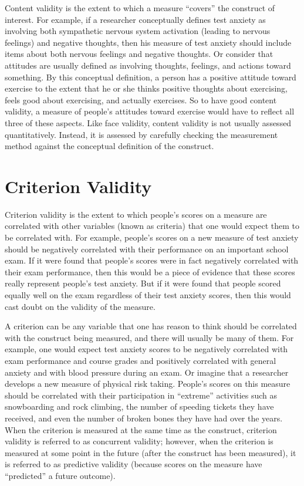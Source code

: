 \documentclass[]{book}
\theoremstyle{definition}
\theoremstyle{definition}
\theoremstyle{remark}
\begin{document}
Content validity is the extent to which a measure ``covers'' the
construct of interest. For example, if a researcher conceptually defines
test anxiety as involving both sympathetic nervous system activation
(leading to nervous feelings) and negative thoughts, then his measure of
test anxiety should include items about both nervous feelings and
negative thoughts. Or consider that attitudes are usually defined as
involving thoughts, feelings, and actions toward something. By this
conceptual definition, a person has a positive attitude toward exercise
to the extent that he or she thinks positive thoughts about exercising,
feels good about exercising, and actually exercises. So to have good
content validity, a measure of people's attitudes toward exercise would
have to reflect all three of these aspects. Like face validity, content
validity is not usually assessed quantitatively. Instead, it is assessed
by carefully checking the measurement method against the conceptual
definition of the construct.

\section{Criterion Validity}\label{criterion-validity}

Criterion validity is the extent to which people's scores on a measure
are correlated with other variables (known as criteria) that one would
expect them to be correlated with. For example, people's scores on a new
measure of test anxiety should be negatively correlated with their
performance on an important school exam. If it were found that people's
scores were in fact negatively correlated with their exam performance,
then this would be a piece of evidence that these scores really
represent people's test anxiety. But if it were found that people scored
equally well on the exam regardless of their test anxiety scores, then
this would cast doubt on the validity of the measure.

A criterion can be any variable that one has reason to think should be
correlated with the construct being measured, and there will usually be
many of them. For example, one would expect test anxiety scores to be
negatively correlated with exam performance and course grades and
positively correlated with general anxiety and with blood pressure
during an exam. Or imagine that a researcher develops a new measure of
physical risk taking. People's scores on this measure should be
correlated with their participation in ``extreme'' activities such as
snowboarding and rock climbing, the number of speeding tickets they have
received, and even the number of broken bones they have had over the
years. When the criterion is measured at the same time as the construct,
criterion validity is referred to as concurrent validity; however, when
the criterion is measured at some point in the future (after the
construct has been measured), it is referred to as predictive validity
(because scores on the measure have ``predicted'' a future outcome).
\end{document}
